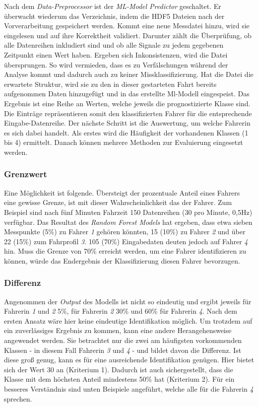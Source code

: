 Nach dem \textit{Data-Preprocessor} ist der \textit{ML-Model Predictor} geschaltet. Er überwacht wiederum das Verzeichnis, indem die HDF5 Dateien nach der Vorverarbeitung gespeichert werden. Kommt eine neue Messdatei hinzu, wird sie eingelesen und auf ihre Korrektheit validiert. Darunter zählt die Überprüfung, ob alle Datenreihen inkludiert sind und ob alle Signale zu jedem gegebenen Zeitpunkt einen Wert haben. Ergeben sich Inkonsistenzen, wird die Datei übersprungen. So wird vermieden, dass es zu Verfälschungen während der Analyse kommt und dadurch auch zu keiner Missklassifizierung. Hat die Datei die erwartete Struktur, wird sie zu den in dieser gestarteten Fahrt bereits aufgenommen Daten hinzugefügt und in das erstellte Ml-Modell eingespeist. Das Ergebnis ist eine Reihe an Werten, welche jeweils die prognostizierte Klasse sind. Die Einträge repräsentieren somit den klassifizierten Fahrer für die entsprechende Eingabe-Datenreihe. Der nächste Schritt ist die Auswertung, um welche Fahrerin es sich dabei handelt. Als erstes wird die Häufigkeit der vorhandenen Klassen (1 bis 4) ermittelt. Danach können mehrere Methoden zur Evaluierung eingesetzt werden.

\subsubsection{Grenzwert}

Eine Möglichkeit ist folgende. Übersteigt der prozentuale Anteil eines Fahrers eine gewisse Grenze, ist mit dieser Wahrscheinlichkeit das der Fahrer. Zum Beispiel sind nach fünf Minuten Fahrzeit 150 Datenreihen (30 pro Minute, 0,5Hz) verfügbar. Das Resultat des \textit{Random Forest Models} hat ergeben, dass etwa sieben Messpunkte (5\%) zu Fahrer \textit{1} gehören könnten, 15 (10\%) zu Fahrer \textit{2} und über 22 (15\%) zum Fahrprofil \textit{3}. 105 (70\%) Eingabedaten deuten jedoch auf Fahrer \textit{4} hin. Muss die Grenze von 70\% erreicht werden, um eine Fahrer identifizieren zu können, würde das Endergebnis der Klassifizierung diesen Fahrer bevorzugen.

\subsubsection{Differenz}
\label{sec:identification_difference}

Angenommen der \textit{Output} des Modells ist nicht so eindeutig und ergibt jeweils für Fahrerin \textit{1} und \textit{2} 5\%, für Fahrerin \textit{2} 30\% und 60\% für Fahrerin \textit{4}. Nach dem ersten Ansatz wäre hier keine eindeutige Identifikation möglich. Um trotzdem auf ein zuverlässiges Ergebnis zu kommen, kann eine andere Herangehensweise angewendet werden. Sie betrachtet nur die zwei am häufigsten vorkommenden Klassen - in diesem Fall Fahrerin \textit{3} und \textit{4} - und bildet davon die Differenz. Ist diese groß genug, kann es für eine ausreichende Identifikation genügen. Hier bietet sich der Wert 30 an (Kriterium 1). Dadurch ist auch sichergestellt, dass die Klasse mit dem höchsten Anteil mindestens 50\% hat (Kriterium 2). Für ein besseres Verständnis sind unten Beispiele angeführt, welche alle für die Fahrerin \textit{4} sprechen.

